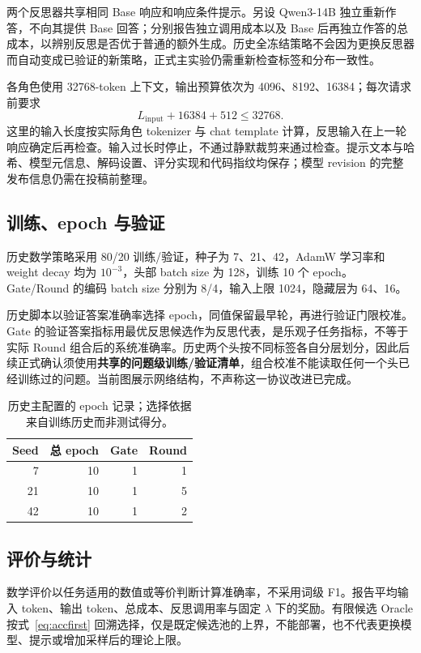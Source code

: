 \documentclass[11pt]{article}
\begin{document}
两个反思器共享相同 Base 响应和响应条件提示。另设 Qwen3-14B 独立重新作答，不向其提供 Base 回答；分别报告独立调用成本以及 Base 后再独立作答的总成本，以辨别反思是否优于普通的额外生成。历史全冻结策略不会因为更换反思器而自动变成已验证的新策略，正式主实验仍需重新检查标签和分布一致性。

各角色使用 32768-token 上下文，输出预算依次为 4096、8192、16384；每次请求前要求
\begin{equation}
L_{\mathrm{input}}+16384+512\leq32768.
\end{equation}
这里的输入长度按实际角色 tokenizer 与 chat template 计算，反思输入在上一轮响应确定后再检查。输入过长时停止，不通过静默裁剪来通过检查。提示文本与哈希、模型元信息、解码设置、评分实现和代码指纹均保存；模型 revision 的完整发布信息仍需在投稿前整理。

\subsection{训练、epoch 与验证}
历史数学策略采用 80/20 训练/验证，种子为 7、21、42，AdamW 学习率和 weight decay 均为 $10^{-3}$，头部 batch size 为 128，训练 10 个 epoch。Gate/Round 的编码 batch size 分别为 8/4，输入上限 1024，隐藏层为 64、16。

历史脚本以验证答案准确率选择 epoch，同值保留最早轮，再进行验证门限校准。Gate 的验证答案指标用最优反思候选作为反思代表，是乐观子任务指标，不等于实际 Round 组合后的系统准确率。历史两个头按不同标签各自分层划分，因此后续正式确认须使用\textbf{共享的问题级训练/验证清单}，组合校准不能读取任何一个头已经训练过的问题。当前图展示网络结构，不声称这一协议改进已完成。

\begin{table}[t]
\centering\small
\caption{历史主配置的 epoch 记录；选择依据来自训练历史而非测试得分。}
\label{tab:epochs}
\begin{tabular}{rrrr}
\toprule
Seed & 总 epoch & Gate & Round\\
\midrule
7 & 10 & 1 & 1\\
21 & 10 & 1 & 5\\
42 & 10 & 1 & 2\\
\bottomrule
\end{tabular}
\end{table}

\subsection{评价与统计}
数学评价以任务适用的数值或等价判断计算准确率，不采用词级 F1。报告平均输入 token、输出 token、总成本、反思调用率与固定 $\lambda$ 下的奖励。有限候选 Oracle 按式~\ref{eq:accfirst} 回溯选择，仅是既定候选池的上界，不能部署，也不代表更换模型、提示或增加采样后的理论上限。
\end{document}
